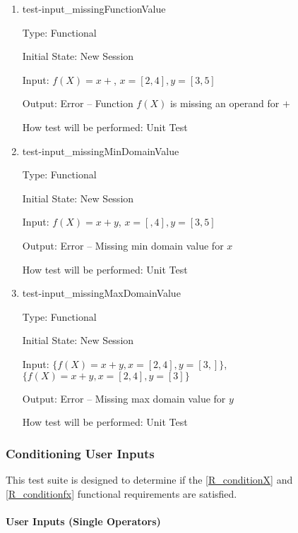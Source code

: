 \documentclass[12pt, titlepage]{article}
\begin{document}
\begin{enumerate}
	
	\item{test-input\_missingFunctionValue}
	
	Type: Functional
	
	Initial State: New Session
	
	Input: $f(X) = x +$, $x = [2,4], y = [3,5]$
	
	Output: Error -- Function $f(X)$ is missing an operand for $+$
	
	How test will be performed: Unit Test\\
	
	\item{test-input\_missingMinDomainValue}
	
	Type: Functional
	
	Initial State: New Session
	
	Input: $f(X) = x + y$, $x = [,4], y = [3,5]$
	
	Output: Error -- Missing min domain value for $x$
	
	How test will be performed: Unit Test\\
	
	\item{test-input\_missingMaxDomainValue}
	
	Type: Functional
	
	Initial State: New Session
	
	Input: $\{f(X) = x + y, x = [2,4], y = [3,]\}$, $\{f(X) = x + y, x = 
	[2,4], y = [3]\}$
	
	Output: Error -- Missing max domain value for $y$
	
	How test will be performed: Unit Test
	
\end{enumerate}

\subsubsection{Conditioning User Inputs}
This test suite is designed to determine if the \ref{R_conditionX} and 
\ref{R_conditionfx} functional requirements are satisfied.

\paragraph{User Inputs (Single Operators)}

\end{document}
